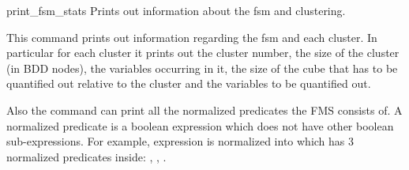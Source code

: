 \begin{nusmvCommand}{print\_fsm\_stats} {Prints out information about the fsm and clustering.}


   This command prints out information regarding the fsm and each cluster.
   In particular for each cluster it prints out the cluster number, the size
   of the cluster (in BDD nodes), the variables occurring in it, the size of
   the cube that has to be quantified out relative to the cluster and the
   variables to be quantified out. 

   Also the command can print all the normalized predicates the FMS
   consists of. A normalized predicate is a boolean expression which
   does not have other boolean sub-expressions. For example,
   expression  is normalized into  which has 3 normalized predicates inside:
   , , .
   

\begin{cmdOpt}
\end{cmdOpt}

\end{nusmvCommand}
